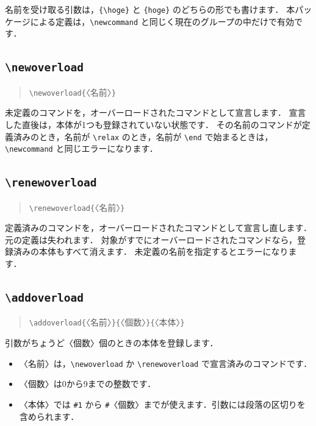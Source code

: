 \documentclass[lualatex,ja = standard,a4paper,11pt]{bxjsarticle}
\newcommand\cs[1]{\texttt{\textbackslash #1}}
\newcommand\marg[1]{\texttt{\{}〈#1〉\texttt{\}}}
\begin{document}
名前を受け取る引数は，\verb|{\hoge}| と \verb|{hoge}| のどちらの形でも書けます．
本パッケージによる定義は，\verb|\newcommand| と同じく現在のグループの中だけで有効です．

\subsection{\texttt{\textbackslash newoverload}}

\begin{quote}
\cs{newoverload}\marg{名前}
\end{quote}

未定義のコマンドを，オーバーロードされたコマンドとして宣言します．
宣言した直後は，本体が1つも登録されていない状態です．
その名前のコマンドが定義済みのとき，名前が \verb|\relax| のとき，名前が \verb|\end| で始まるときは，\verb|\newcommand| と同じエラーになります．

\subsection{\texttt{\textbackslash renewoverload}}

\begin{quote}
\cs{renewoverload}\marg{名前}
\end{quote}

定義済みのコマンドを，オーバーロードされたコマンドとして宣言し直します．
元の定義は失われます．
対象がすでにオーバーロードされたコマンドなら，登録済みの本体もすべて消えます．
未定義の名前を指定するとエラーになります．

\subsection{\texttt{\textbackslash addoverload}}

\begin{quote}
\cs{addoverload}\marg{名前}\marg{個数}\marg{本体}
\end{quote}

引数がちょうど〈個数〉個のときの本体を登録します．

\begin{itemize}
\item 〈名前〉は，\verb|\newoverload| か \verb|\renewoverload| で宣言済みのコマンドです．
\item 〈個数〉は0から9までの整数です．
\item 〈本体〉では \verb|#1| から \verb|#|〈個数〉までが使えます．引数には段落の区切りを含められます．
\end{itemize}
\end{document}

